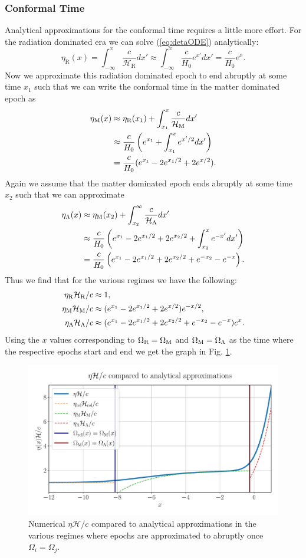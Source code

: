 \documentclass[%
reprint,
 amsmath,amssymb,
 aps,
]{revtex4-2}
\newcommand{\Hp}{\mathcal{H}}
\begin{document}
\subsubsection{Conformal Time}
Analytical approximations for the conformal time requires a little more effort. For the radiation dominated era we can solve (\ref{eq:detaODE}) analytically:
\[\eta_\text{R}(x)=\int_{-\infty}^x\frac{c}{\Hp_\text{R}}dx'\approx\int_{-\infty}^x\frac{c}{H_0}e^{x'}dx'=\frac{c}{H_0}e^x.\]
Now we approximate this radiation dominated epoch to end abruptly at some time $x_1$ such that we can write the conformal time in the matter dominated epoch as
\begin{align*}
	\eta_\text M(x)&\approx\eta_\text{R}(x_1)+\int_{x_1}^x\frac{c}{\Hp_\text M}dx'\\
	&\approx\frac{c}{H_0}\left(e^{x_1}+\int_{x_1}^xe^{x'/2}dx' \right)\\
	&=\frac{c}{H_0}(e^{x_1}-2e^{x_1/2}+2e^{x/2}).
\end{align*}
Again we assume that the matter dominated epoch ends abruptly at some time $x_2$ such that we can approximate
\begin{align*}
	\eta_\Lambda(x)&\approx\eta_\text M(x_2)+\int_{x_2}^\infty\frac{c}{\Hp_\Lambda}dx'\\
	&\approx\frac{c}{H_0}\left(e^{x_1}-2e^{x_1/2}+2e^{x_2/2}+\int_{x_2}^x e^{-x'}dx' \right)\\
	&=\frac{c}{H_0}\left(e^{x_1}-2e^{x_1/2}+2e^{x_2/2}+e^{-x_2}-e^{-x} \right).
\end{align*}
Thus we find that for the various regimes we have the following:
\begin{align*}
	\eta_\text{R}\Hp_\text{R}/c&\approx1,\\
	\eta_\text M\Hp_\text M/c&\approx(e^{x_1}-2e^{x_1/2}+2e^{x/2})e^{-x/2},\\
	\eta_\Lambda\Hp_\Lambda/c&\approx(e^{x_1}-2e^{x_1/2}+2e^{x_2/2}+e^{-x_2}-e^{-x})e^{x}.
\end{align*}
Using the $x$ values corresponding to $\Omega_{\text{R}}=\Omega_\text M$ and $\Omega_{\text M}=\Omega_\Lambda$ as the time where the respective epochs start and end we get the graph in Fig. \ref{fig:eta_vs_anal_merge}.
\begin{figure}[ht!]
	\includegraphics[width = \linewidth]{Figures/Eta_vs_anal_merge.pdf}
	\caption{Numerical $\eta\Hp/c$ compared to analytical approximations in the various regimes where epochs are approximated to abruptly once $\Omega_i=\Omega_j$.}
	\label{fig:eta_vs_anal_merge}
\end{figure}
\end{document}
